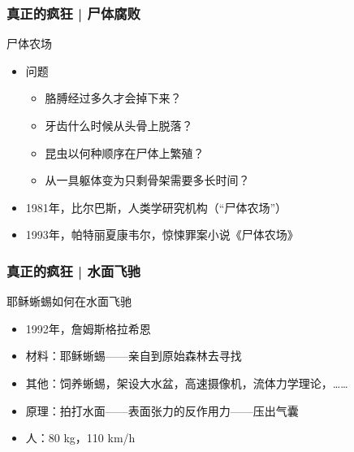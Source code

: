 \begin{frame}
  \frametitle{真正的疯狂 | 尸体腐败}
  \begin{block}{尸体农场}
    \begin{itemize}
      \item 问题
        \begin{itemize}
          \item 胳膊经过多久才会掉下来？
          \item 牙齿什么时候从头骨上脱落？
          \item 昆虫以何种顺序在尸体上繁殖？
          \item 从一具躯体变为只剩骨架需要多长时间？
        \end{itemize}
      \item 1981年，比尔\textbullet 巴斯，人类学研究机构（“尸体农场”）
      \item 1993年，帕特丽夏\textbullet 康韦尔，惊悚罪案小说《尸体农场》
    \end{itemize}
  \end{block}
\end{frame}

\begin{frame}
  \frametitle{真正的疯狂 | 水面飞驰}
  \begin{block}{耶稣蜥蜴如何在水面飞驰}
    \pause
    \begin{itemize}
      \item 1992年，詹姆斯\textbullet 格拉希恩
      \item 材料：耶稣蜥蜴——亲自到原始森林去寻找
      \item 其他：饲养蜥蜴，架设大水盆，高速摄像机，流体力学理论，……
      \item 原理：拍打水面——表面张力的反作用力——压出气囊
      \item 人：80 kg，110 km/h
    \end{itemize}
  \end{block}
\end{frame}


